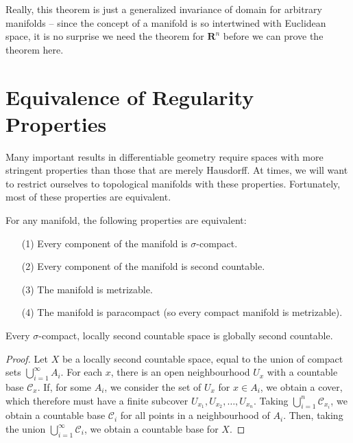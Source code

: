 Really, this theorem is just a generalized invariance of domain for arbitrary manifolds -- since the concept of a manifold is so intertwined with Euclidean space, it is no surprise we need the theorem for $\mathbf{R}^n$ before we can prove the theorem here.

\section{Equivalence of Regularity Properties}

Many important results in differentiable geometry require spaces with more stringent properties than those that are merely Hausdorff. At times, we will want to restrict ourselves to topological manifolds with these properties. Fortunately, most of these properties are equivalent.

\begin{theorem}
    For any manifold, the following properties are equivalent:
    \begin{enumerate}
        \item[(1)] Every component of the manifold is $\sigma$-compact.
        \item[(2)] Every component of the manifold is second countable.
        \item[(3)] The manifold is metrizable.
        \item[(4)] The manifold is paracompact (so every compact manifold is metrizable).
    \end{enumerate}
\end{theorem}

\begin{lemma}[$1) \to (2$]
    Every $\sigma$-compact, locally second countable space is globally second countable.
\end{lemma}
\begin{proof}
    Let $X$ be a locally second countable space, equal to the union of compact sets $\bigcup_{i = 1}^\infty A_i$. For each $x$, there is an open neighbourhood $U_x$ with a countable base $\mathcal{C}_x$. If, for some $A_i$, we consider the set of $U_x$ for $x \in A_i$, we obtain a cover, which therefore must have a finite subcover $U_{x_1}, U_{x_2}, \dots, U_{x_n}$. Taking $\bigcup_{i = 1}^n \mathcal{C}_{x_i}$, we obtain a countable base $\mathcal{C}_i$ for all points in a neighbourhood of $A_i$. Then, taking the union $\bigcup_{i = 1}^\infty \mathcal{C}_i$, we obtain a countable base for $X$.
\end{proof}

